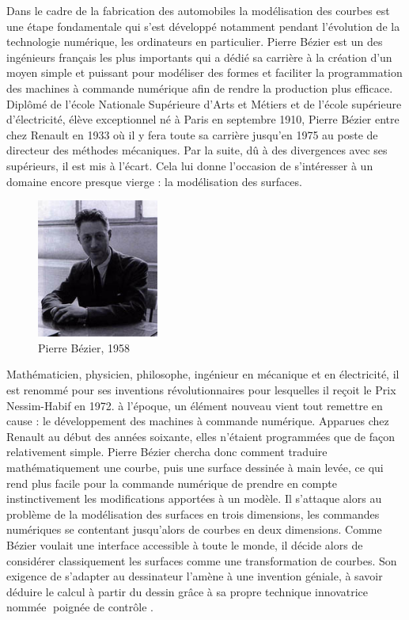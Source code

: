 \documentclass{article}
\begin{document}
	Dans le cadre de la fabrication des automobiles la mod\'{e}lisation des courbes est une \'{e}tape
fondamentale qui s'est d\'{e}velopp\'{e} notamment pendant l'\'{e}volution de la technologie num\'{e}rique, les ordinateurs en particulier. Pierre B\'{e}zier est un des ing\'{e}nieurs fran\c cais les plus importants qui a d\'{e}di\'{e} sa carri\`{e}re \`{a} la cr\'{e}ation d'un moyen simple et puissant pour mod\'{e}liser des formes et faciliter la programmation des machines \`{a} commande num\'{e}rique afin de rendre la production plus efficace.
\\
\indent
Dipl\^{o}m\'{e} de l'\'{e}cole Nationale Sup\'{e}rieure d'Arts et M\'{e}tiers et de l'\'{e}cole sup\'{e}rieure d'\'{e}lectricit\'{e}, \'{e}l\`{e}ve exceptionnel n\'{e} \`{a} Paris en septembre 1910, Pierre B\'{e}zier entre chez Renault en 1933 o\`{u} il y fera toute sa carri\`{e}re jusqu'en 1975 au poste de directeur des m\'{e}thodes m\'{e}caniques.
Par la suite, d\^{u} \`{a} des divergences avec ses sup\'{e}rieurs, il est mis \`{a} l'\'{e}cart. Cela lui donne l'occasion de s'int\'{e}resser \`{a} un domaine encore presque vierge : la mod\'{e}lisation des surfaces. 

\begin{figure}[h]
	\centering
	\includegraphics[width=4cm]{Bezier.jpg}
	\caption{Pierre B\'{e}zier, 1958}
\end{figure}

\indent 
Math\'{e}maticien, physicien, philosophe, ing\'{e}nieur en m\'{e}canique et en \'{e}lectricit\'{e}, il est renomm\'{e} pour ses inventions r\'{e}volutionnaires pour lesquelles il re\c coit le Prix Nessim-Habif en 1972. \`{a} l'\'{e}poque, un \'{e}l\'{e}ment nouveau vient tout remettre en cause : le d\'{e}veloppement des machines \`{a} commande num\'{e}rique. Apparues chez Renault au d\'{e}but des ann\'{e}es soixante, elles n'\'{e}taient programm\'{e}es que de fa\c con relativement simple. Pierre B\'{e}zier chercha donc comment traduire math\'{e}matiquement une courbe, puis une surface dessin\'{e}e \`{a} main lev\'{e}e, ce qui rend plus facile pour la commande num\'{e}rique de prendre en compte instinctivement les modifications apport\'{e}es \`{a} un mod\`{e}le. Il s'attaque alors au probl\`{e}me de la mod\'{e}lisation des surfaces en trois dimensions, les commandes num\'{e}riques se contentant jusqu'alors de courbes en deux dimensions. Comme B\'{e}zier voulait une interface accessible \`{a} toute le monde, il d\'{e}cide alors de consid\'{e}rer classiquement les surfaces comme une transformation de courbes. Son exigence de s'adapter au dessinateur l'am\`{e}ne \`{a} une invention g\'{e}niale, \`{a} savoir d\'{e}duire le calcul \`{a} partir du dessin gr\^{a}ce \`{a} sa propre technique innovatrice nomm\'{e}e \guillemotleft $\;$poign\'{e}e de contr\^{o}le \guillemotright.
\end{document}
